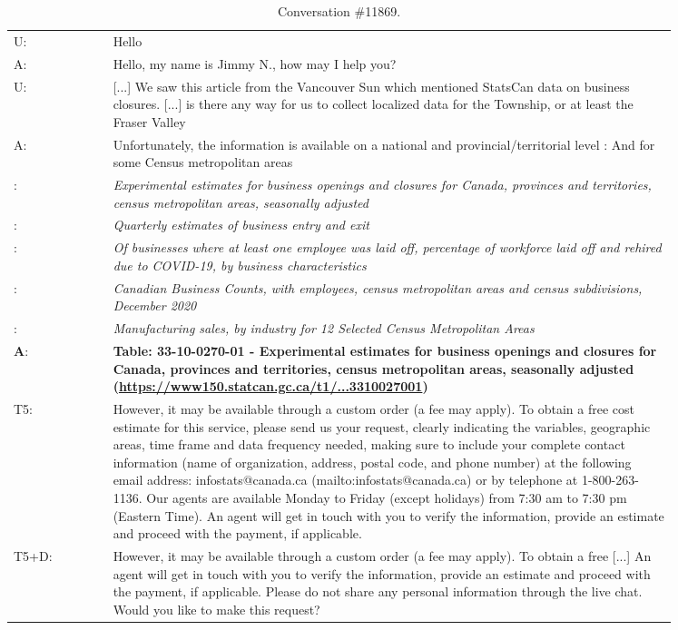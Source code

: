 \documentclass[11pt]{article}
\begin{document}
\begin{table*}[]
\small
\centering
\begin{tabular}{l p{0.85\linewidth}}
\toprule
U: & Hello 
\\
A: & Hello, my name is Jimmy N., how may I help you? 
\\
U: & [...] We saw this article from the Vancouver Sun which mentioned StatsCan data on business closures. [...] is there any way for us to collect localized data for the Township, or at least the Fraser Valley 
\\
A: & Unfortunately, the information is available on a national and provincial/territorial level : And for some Census metropolitan areas
\\
: & \textit{Experimental estimates for business openings and closures for Canada, provinces and territories, census metropolitan areas, seasonally adjusted}
\\
: & \textit{Quarterly estimates of business entry and exit}
\\
: & \textit{Of businesses where at least one employee was laid off, percentage of workforce laid off and rehired due to COVID-19, by business characteristics}
\\
: & \textit{Canadian Business Counts, with employees, census metropolitan areas and census subdivisions, December 2020}
\\
: & \textit{Manufacturing sales, by industry for 12 Selected Census Metropolitan Areas}
\\
\midrule
\textbf{A}: & \textbf{Table: 33-10-0270-01 - Experimental estimates for business openings and closures for Canada, provinces and territories, census metropolitan areas, seasonally adjusted (\href{https://www150.statcan.gc.ca/t1/tbl1/en/tv.action?pid=3310027001}{https://www150.statcan.gc.ca/t1/...3310027001})}
\\
T5: & However, it may be available through a custom order (a fee may apply). To obtain a free cost estimate for this service, please send us your request, clearly indicating the variables, geographic areas, time frame and data frequency needed, making sure to include your complete contact information (name of organization, address, postal code, and phone number) at the following email address: infostats@canada.ca (mailto:infostats@canada.ca) or by telephone at 1-800-263-1136. Our agents are available Monday to Friday (except holidays) from 7:30 am to 7:30 pm (Eastern Time). An agent will get in touch with you to verify the information, provide an estimate and proceed with the payment, if applicable.
\\
T5+D: & However, it may be available through a custom order (a fee may apply). To obtain a free [...] An agent will get in touch with you to verify the information, provide an estimate and proceed with the payment, if applicable. Please do not share any personal information through the live chat. Would you like to make this request?
\\
\bottomrule
\end{tabular}
\caption{Conversation \#11869.}
\label{tab:sample_conversation_11869}
\end{table*}
\end{document}
